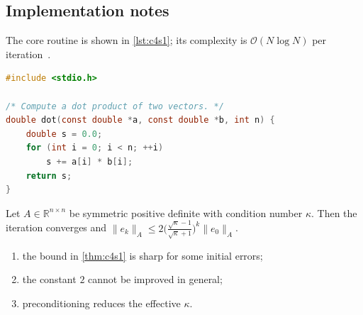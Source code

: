 \kant[8-11]

\subsection{Implementation notes}\label{sec:c4s1-i}
The core routine is shown in \cref{lst:c4s1}; its complexity is $\mathcal{O}(N\log N)$ per iteration~\cite{ch4-5}.

\begin{lstlisting}[language=c,caption={Reference implementation for c4s1.},label={lst:c4s1}]
#include <stdio.h>

/* Compute a dot product of two vectors. */
double dot(const double *a, const double *b, int n) {
    double s = 0.0;
    for (int i = 0; i < n; ++i)
        s += a[i] * b[i];
    return s;
}
\end{lstlisting}

\lipsum[74-74]
\begin{theorem}\label{thm:c4s1}
Let $A\in\mathbb{R}^{n\times n}$ be symmetric positive definite with condition number $\kappa$. Then the iteration converges and
$\lVert e_k\rVert_A \le 2\bigl(\tfrac{\sqrt\kappa-1}{\sqrt\kappa+1}\bigr)^k\lVert e_0\rVert_A$.
\end{theorem}
\begin{enumerate}[label=(\roman*)]
\item the bound in \cref{thm:c4s1} is sharp for some initial errors;
\item the constant $2$ cannot be improved in general;
\item preconditioning reduces the effective $\kappa$.
\end{enumerate}

\lipsum[109-109]
